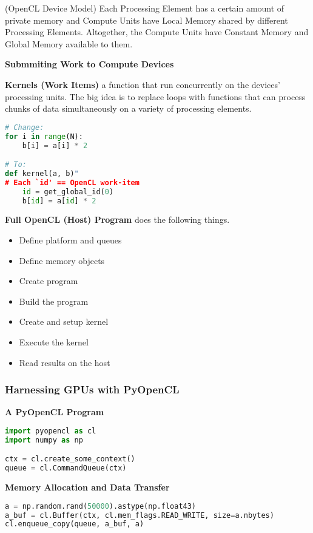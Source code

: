 \documentclass{article}
\begin{document}
(OpenCL Device Model) Each Processing Element has a certain amount of private memory and Compute Units have Local Memory shared by different Processing Elements. Altogether, the Compute Units have Constant Memory and Global Memory available to them. 

\textbf{Submmiting Work to Compute Devices}

\textbf{Kernels (Work Items)} a function that run concurrently on the devices' processing units. The big idea is to replace loops with functions that can process chunks of data simultaneously on a variety of processing elements.

\begin{lstlisting}[language=Python]
# Change:
for i in range(N):
    b[i] = a[i] * 2

# To:
def kernel(a, b)"
# Each `id' == OpenCL work-item
    id = get_global_id(0)
    b[id] = a[id] * 2
\end{lstlisting}

\textbf{Full OpenCL (Host) Program} does the following things.

\begin{itemize}
    \item Define platform and queues
    \item Define memory objects
    \item Create program
    \item Build the program
    \item Create and setup kernel
    \item Execute the kernel
    \item Read results on the host
\end{itemize}

\subsubsection{Harnessing GPUs with PyOpenCL}

\textbf{A PyOpenCL Program}

\begin{lstlisting}[language=Python]
import pyopencl as cl
import numpy as np

ctx = cl.create_some_context()
queue = cl.CommandQueue(ctx)
\end{lstlisting}

\textbf{Memory Allocation and Data Transfer}

\begin{lstlisting}[language=Python]
a = np.random.rand(50000).astype(np.float43)
a_buf = cl.Buffer(ctx, cl.mem_flags.READ_WRITE, size=a.nbytes)
cl.enqueue_copy(queue, a_buf, a)
\end{lstlisting}
\end{document}

